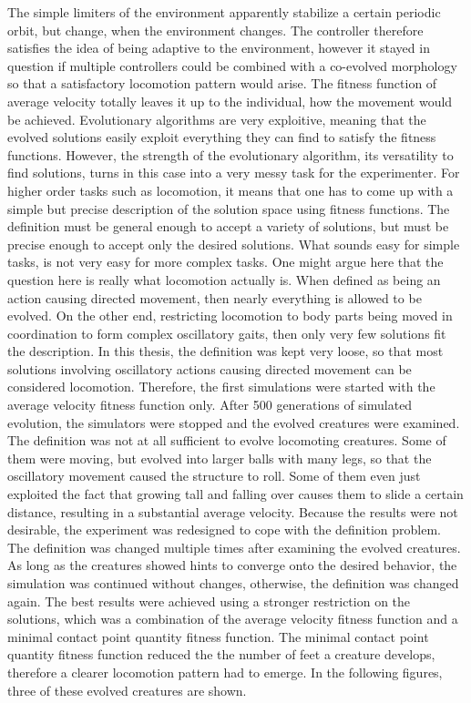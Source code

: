 \documentclass[main]{subfiles}
\begin{document}
The simple limiters of the environment apparently stabilize a certain periodic orbit, but change, when the environment changes. %
%
The controller therefore satisfies the idea of being adaptive to the environment, however it stayed in question if multiple controllers could be combined with a co-evolved morphology so that a satisfactory locomotion pattern would arise. %
%
The fitness function of average velocity totally leaves it up to the individual, how the movement would be achieved. %
%
Evolutionary algorithms are very exploitive, meaning that the evolved solutions easily exploit everything they can find to satisfy the fitness functions. %
%
However, the strength of the evolutionary algorithm, its versatility to find solutions, turns in this case into a very messy task for the experimenter. %
%
For higher order tasks such as locomotion, it means that one has to come up with a simple but precise description of the solution space using fitness functions. %
%
The definition must be general enough to accept a variety of solutions, but must be precise enough to accept only the desired solutions. %
%
What sounds easy for simple tasks, is not very easy for more complex tasks. %
%
One might argue here that the question here is really what locomotion actually is. %
%
When defined as being an action causing directed movement, then nearly everything is allowed to be evolved. %
%
On the other end, restricting locomotion to body parts being moved in coordination to form complex oscillatory gaits, then only very few solutions fit the description. %
%
In this thesis, the definition was kept very loose, so that most solutions involving oscillatory actions causing directed movement can be considered locomotion. %
%
Therefore, the first simulations were started with the average velocity fitness function only. %
%
After 500 generations of simulated evolution, the simulators were stopped and the evolved creatures were examined. %
%
The definition was not at all sufficient to evolve locomoting creatures. %
%
Some of them were moving, but evolved into larger balls with many legs, so that the oscillatory movement caused the structure to roll. %
%
Some of them even just exploited the fact that growing tall and falling over causes them to slide a certain distance, resulting in a substantial average velocity. %
%
Because the results were not desirable, the experiment was redesigned to cope with the definition problem. %
%
The definition was changed multiple times after examining the evolved creatures. %
%
As long as the creatures showed hints to converge onto the desired behavior, the simulation was continued without changes, otherwise, the definition was changed again. %
%
The best results were achieved using a stronger restriction on the solutions, which was a combination of the average velocity fitness function and a minimal contact point quantity fitness function. %
%
The minimal contact point quantity fitness function reduced the the number of feet a creature develops, therefore a clearer locomotion pattern had to emerge. %
%
In the following figures, three of these evolved creatures are shown.
\end{document}
